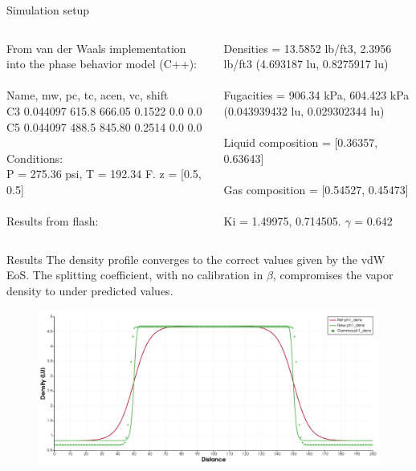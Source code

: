\documentclass[8pt]{beamer}
\begin{document}
	\begin{frame}{Simulation setup}
		
		\begin{columns}
			
			From van der Waals implementation into the phase behavior model (C++):\\~\\
			
			Name, mw, pc, tc, acen, vc, shift\\
			C3 0.044097 615.8 666.05 0.1522 0.0 0.0\\
			C5 0.044097 488.5 845.80 0.2514 0.0 0.0\\~\\
			
			Conditions:\\
			P = 275.36 psi, T = 192.34 F. z = [0.5, 0.5]\\~\\
			
			Results from flash:
			
			Densities = 13.5852 lb/ft3, 2.3956 lb/ft3 (4.693187 lu, 0.8275917 lu)\\~\\
			Fugacities = 906.34 kPa, 604.423 kPa (0.043939432 lu, 0.029302344 lu)\\~\\
			Liquid composition = [0.36357, 0.63643]\\~\\
			Gas composition = [0.54527, 0.45473]\\~\\
			Ki = 1.49975, 0.714505. $\gamma$ = 0.642
			
		\end{columns}
		
	\end{frame}


	\begin{frame}{Results}
		The density profile converges to the correct values given by the vdW EoS. The splitting coefficient, with no calibration in $\beta$, compromises the vapor density to under predicted values.
		\begin{figure}
			\centering
			\includegraphics[width=\textwidth]{pics/1dnewForce/density.png}
		\end{figure}
	\end{frame}
	
\end{document}

